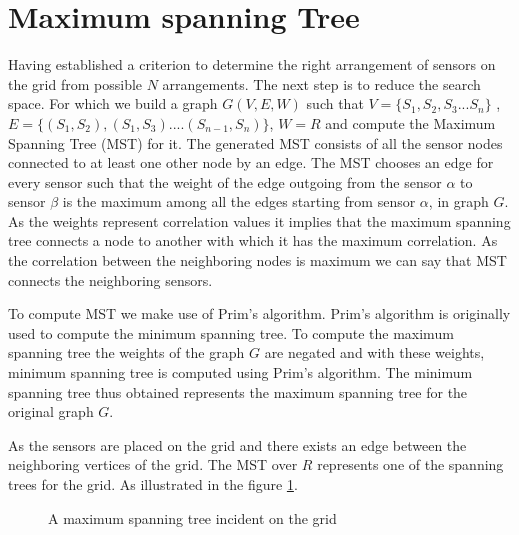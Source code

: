 \section{Maximum spanning Tree}

Having established a criterion to determine the right arrangement of sensors on the grid from  possible ${N}$ arrangements. The next step is to reduce the search space. For which we build a graph $G(V,E,W)$ such that $V = \{S_1,S_2,S_3...S_n\}$ , $ E= \{(S_1,S_2),(S_1,S_3)....(S_{n-1},S_n)\}$, $W = R$ and compute the Maximum Spanning Tree (MST) for it. The generated MST consists of all the sensor nodes connected to at least one other node by an edge. The MST chooses an edge for every sensor such that the weight of the edge outgoing from the sensor $\alpha$ to sensor $\beta$ is the maximum among all the edges starting from sensor $\alpha$, in graph ${G}$. As the weights represent correlation values it implies that the maximum spanning tree connects a node to another with which it has the maximum correlation. As the correlation between the neighboring nodes is maximum we can say that MST connects the neighboring sensors.

To compute MST we make use of Prim's algorithm\cite{BLTJ:BLTJ1515}.  Prim's algorithm is originally used to compute the minimum spanning tree. To compute the maximum spanning tree the weights of the graph $G$ are negated and with these weights, minimum spanning tree is computed using Prim's algorithm. The minimum spanning tree thus obtained represents the maximum spanning tree for the original graph $G$.

As the sensors are placed on the grid and there exists an edge between the neighboring vertices of the grid. The MST over ${R}$ represents one of the spanning trees for the grid. As illustrated in the figure \ref{fig:MST}.

\begin{figure}[!ht]
\qquad \qquad \qquad
{}
\caption{A maximum spanning tree incident on the grid}
\label{fig:MST}
\end{figure}




